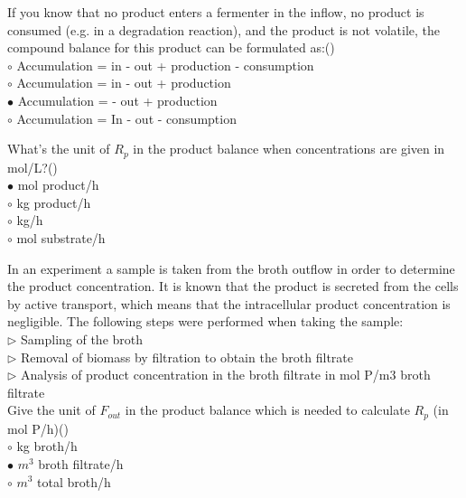 \documentclass[]{beamer}
\begin{document}
\begin{frame}[shrink] {}
\addtocounter{questions}{1}
\color{blue}
If you know that no product enters a fermenter in the inflow, no product is consumed (e.g. in a degradation reaction), and the product is not volatile, the compound balance for this product can be formulated as:()\\
\color{black}
\setlength{\parindent}{-0.4cm}
{\color{red}$\circ$}  Accumulation = in - out + production - consumption\\
{\color{red}$\circ$} Accumulation = in - out + production \\
{\color{red}$\bullet$} Accumulation = - out + production \\
{\color{red}$\circ$} Accumulation = In - out - consumption
\end{frame}

\begin{frame}[shrink] {}
\addtocounter{questions}{1}
\color{blue}
What’s the unit of $R_p$ in the product balance when concentrations are given in mol/L?()\\
\color{black}
\setlength{\parindent}{-0.4cm}
{\color{red}$\bullet$} mol product/h \\
{\color{red}$\circ$} kg product/h\\
{\color{red}$\circ$} kg/h\\
{\color{red}$\circ$} mol substrate/h\\
\end{frame}

\begin{frame}[shrink] {}
\addtocounter{questions}{1}
\color{blue}
In an experiment a sample is taken from the broth outflow in order to determine the product concentration. It is known that the product is secreted from the cells by active transport, which means that the intracellular product concentration is negligible. The following steps were performed when taking the sample:\\
{\color{red}$\triangleright$} Sampling of the broth\\
{\color{red}$\triangleright$} Removal of biomass by filtration to obtain the broth filtrate\\
{\color{red}$\triangleright$} Analysis of product concentration in the broth filtrate in mol P/m3 broth filtrate\\[0.5em]

  Give the unit of $F_{out}$ in the product balance which is needed to calculate $R_p$ (in mol P/h)()\\
\color{black}
\setlength{\parindent}{-0.4cm}
{\color{red}$\circ$}  kg broth/h\\
{\color{red}$\bullet$} $m^3$ broth filtrate/h \\
{\color{red}$\circ$} $m^3$ total broth/h \\
\end{frame}
\end{document}
